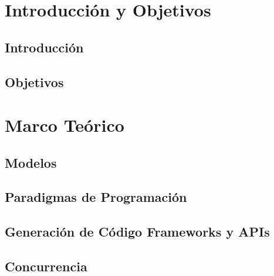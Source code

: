 \documentclass{report}
\newcounter{definitionsCounter}
\begin{document}
    \tableofcontents
    
    \listoffigures
    \listoftables


    \setcounter{definitionsCounter}{0}
    \part{Introducción y Objetivos}
        \chapter{Introducción}
        
        \chapter{Objetivos}
        
    \part{Marco Teórico}
        \label{cap:marco_teorico}
        
        \chapter{Modelos}
            \label{cap:modelos}
            
        \chapter{Paradigmas de Programación}
            \label{cap:paradigmas_programacion}
            
            
            
        \chapter{Generación de Código Frameworks y APIs}
            \label{generacion_frameworks_apis}
            
            
        \chapter{Concurrencia}
            \label{cap:concurrencia}
            
\end{document}
